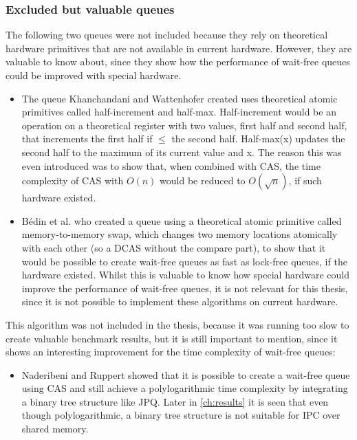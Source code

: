 \subsubsection{Excluded but valuable queues}
The following two queues were not included because they rely on theoretical hardware primitives that are not available in current hardware. However, they are valuable to know about, since they show how the performance of wait-free queues could be improved with special hardware.
\begin{itemize}
    \item The queue Khanchandani and Wattenhofer \cite{halfincrementhalfmax} created uses theoretical atomic primitives called half-increment and half-max. Half-increment would be an operation on a theoretical register with two values, first half and second half, that increments the first half if $\leq$ the second half. Half-max(x) updates the second half to the maximum of its current value and x. The reason this was even introduced was to show that, when combined with \ac{CAS}, the time complexity of \ac{CAS} with $O(n)$ would be reduced to $O(\sqrt{n})$, if such hardware existed.
    \item Bédin et al. \cite{memorytomemory} who created a queue using a theoretical atomic primitive called memory-to-memory swap, which changes two memory locations atomically with each other (so a \ac{DCAS} without the compare part), to show that it would be possible to create wait-free queues as fast as lock-free queues, if the hardware existed. Whilst this is valuable to know how special hardware could improve the performance of wait-free queues, it is not relevant for this thesis, since it is not possible to implement these algorithms on current hardware.
\end{itemize}
This algorithm was not included in the thesis, because it was running too slow to create valuable benchmark results, but it is still important to mention, since it shows an interesting improvement for the time complexity of wait-free queues:
\begin{itemize}
    \item Naderibeni and Ruppert \cite{polylog} showed that it is possible to create a wait-free queue using \ac{CAS} and still achieve a polylogarithmic time complexity by integrating a binary tree structure like \ac{JPQ}. Later in \cref{ch:results} it is seen that even though polylogarithmic, a binary tree structure is not suitable for \ac{IPC} over shared memory.
\end{itemize}
